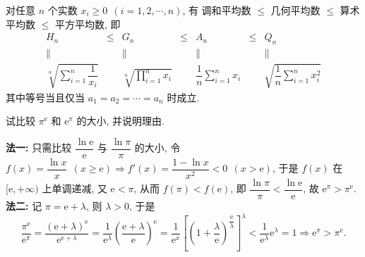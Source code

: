\begin{theorem}[均值不等式]
    对任意 $n$ 个实数 $x_i\geqslant 0~~(i=1,2,\cdots,n)$, 有\label{meanInequality}
    调和平均数 $\leqslant$ 几何平均数 $\leqslant$ 算术平均数 $\leqslant$ 平方平均数, 即
    $$\begin{matrix}
            H_n                                                    & \leqslant & G_n                                                    & \leqslant & A_n       & \leqslant & Q_n       \\
            \parallel                                              &           & \parallel                                              &           & \parallel &           & \parallel \\
            \sqrt[n]{\displaystyle \sum_{i=1}^{n}\dfrac{1}{x_i}  } &           & \sqrt[n]{\displaystyle \prod _{i=1}^n x_i}             &           &
            \displaystyle \dfrac{1}{n}\sum_{i=1}^{n}x_i            &           & \sqrt{\displaystyle \dfrac{1}{n}\sum_{i=1}^{n}x_i^2  }
        \end{matrix}$$
    其中等号当且仅当 $a_1=a_2=\cdots=a_n$ 时成立.
\end{theorem}

\begin{example}
    试比较 $\pi^{\mathrm{e}}$ 和 $\mathrm{e}^\pi$ 的大小, 并说明理由.
\end{example}
\begin{solution}
    \textbf{法一: }只需比较 $\dfrac{\ln \mathrm{e}}{\mathrm{e}}$ 与 $\dfrac{\ln\pi}{\pi}$ 的大小, 
    令 $f(x)=\dfrac{\ln x}{x}~~(x\geqslant \mathrm{e})\Rightarrow f'(x)=\dfrac{1-\ln x}{x^2}<0~~(x>\mathrm{e})$, 于是 $f(x)$ 在 $[\mathrm{e},+\infty)$ 上单调递减, 
    又 $\mathrm{e}<\pi$, 从而 $f(\pi)<f(\mathrm{e})$, 即 $\dfrac{\ln\pi}{\pi}<\dfrac{\ln \mathrm{e}}{\mathrm{e}}$, 故 $\mathrm{e}^\pi>\pi^{\mathrm{e}}.$\\
    \textbf{法二: }记 $\pi=\mathrm{e}+\lambda$, 则 $\lambda>0$, 于是
    $$\dfrac{\pi ^{\mathrm{e}}}{\mathrm{e}^{\pi }}=\dfrac{\left( \mathrm{e}+\lambda \right) ^{\mathrm{e}}}{\mathrm{e}^{\mathrm{e}+\lambda }}=\dfrac{1}{\mathrm{e}^{\lambda }}\left( \dfrac{\mathrm{e}+\lambda }{\mathrm{e}}\right) ^{\mathrm{e}}=\dfrac{1}{\mathrm{e}^{x}}\left[ \left( 1+\dfrac{\lambda }{\mathrm{e}}\right) ^{\dfrac{\mathrm{e}}{\lambda }}\right] ^{\lambda } <\dfrac{1}{\mathrm{e}^{\lambda }}\mathrm{e}^{\lambda }=1\Rightarrow\mathrm{e}^\pi>\pi^{\mathrm{e}}.$$
\end{solution}

